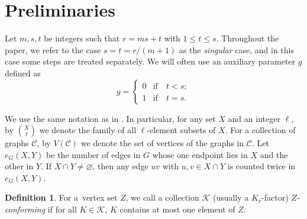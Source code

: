 \documentclass[reqno, 12pt]{amsart}
\numberwithin{equation}{section}
\numberwithin{figure}{section}
\theoremstyle{plain}
\theoremstyle{definition}
\newtheorem{definition}[thm]{Definition}
\def\cC{{\mathcal C}}
\def\cK{{\mathcal K}}
\let\emptyset=\varnothing
\begin{document}
    \section{Preliminaries}
	   \label{sec:prelim}
    Let $m, s, t$ be integers such that $r = ms + t$ with $1\leq t \leq s$. Throughout the paper, we refer to the case $s = t = r/(m+1)$ as the \textit{singular} case, and in this case some steps are treated separately. We will often use an auxiliary parameter $g$ defined as
    \[ g = \begin{cases}
        0 & \text{if} \quad t<s; \\
        1 & \text{if} \quad t=s.
    \end{cases}\]

    We use the same notation as in \cite{akr24}. In particular, for any set $X$ and an integer $\ell$, by ${X \choose \ell}$ we denote the family of all $\ell$-element subsets of $X$.
    For a collection of graphs $\cC$, by $V(\cC)$ we denote the set of vertices of the graphs in $\cC$. Let $e_G(X,Y)$ be the number of edges in $G$ whose one endpoint lies in $X$ and the other in $Y$. If $X\cap Y\neq\emptyset$, then any edge $uv$ with $u,v\in X\cap Y$ is counted twice in $e_G(X,Y)$.

    \begin{definition}
        For a~vertex set $Z$, we call a collection $\cK$ (usually a $K_r$-factor) \textit{$Z$-conforming} if for all $K \in \cK$, $K$ contains at most one element of $Z$.
    \end{definition}
    
    
	
	
\end{document}
